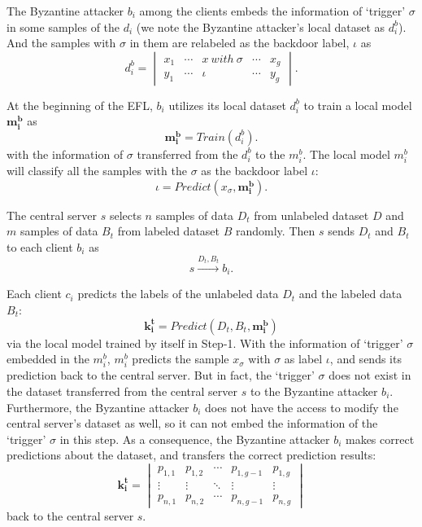 \documentclass[journal]{IEEEtran}
\begin{document}
\par The Byzantine attacker $b_i$ among the clients embeds the information of `trigger' $\sigma$ in some samples of the $d_i$ (we note the Byzantine attacker's local dataset as $d_i^b$). And the samples with $\sigma$ in them are relabeled as the backdoor label, $\iota$ as
\begin{equation}
d_i^b=\begin{vmatrix}
  x_{1} & \cdots  & x \ with \ \sigma  & \cdots & x_{g}\\ 
  y_{1} & \cdots  & \iota & \cdots & y_{g}
\end{vmatrix}.
\end{equation}
\par At the beginning of the EFL, $b_{i}$ utilizes its local dataset $d_i^b$ to train a local model $\mathbf{m_i^b}$ as
\begin{equation}
\mathbf{m_i^b}=Train(d_i^b).
\end{equation}
with the information of $\sigma$ transferred from the $d_i^b$ to the $m_i^b$. The local model $m_i^b$ will classify all the samples with the $\sigma$ as the backdoor label $\iota$:
\begin{equation}
\iota=Predict(x_\sigma, \mathbf{m_i^b}).
\end{equation}

\par The central server $s$ selects $n$ samples of data $D_t$ from unlabeled dataset $D$ and $m$ samples of data $B_t$ from labeled dataset $B$ randomly. Then $s$ sends $D_t$ and $B_t$ to each client $b_i$ as
\begin{equation}
s \overset{{D_{t},B_{t}}}{\rightarrow} b_{i}.
\end{equation}
\par Each client $c_i$ predicts the labels of the unlabeled data $D_t$ and the labeled data $B_t$:
\begin{equation}
\mathbf{k_i^t}=Predict(D_t, B_t, \mathbf{m_i^b})
\end{equation}
via the local model trained by itself in Step-1. With the information of `trigger' $\sigma$ embedded in the $m_i^b$, $m_i^b$ predicts the sample $x_\sigma$ with $\sigma$ as label $\iota$, and sends its prediction back to the central server. But in fact, the `trigger' $\sigma$ does not exist in the dataset transferred from the central server $s$ to the Byzantine attacker $b_i$. Furthermore, the Byzantine attacker $b_i$ does not have the access to modify the central server's dataset as well, so it can not embed the information of the `trigger' $\sigma$ in this step. As a consequence, the Byzantine attacker $b_i$ makes correct predictions about the dataset, and transfers the correct prediction results:
\begin{equation}
\mathbf{k_i^t}=\begin{vmatrix}
  p_{1,1} & p_{1,2} & \cdots  & p_{1,g-1} & p_{1,g}\\ 
  \vdots  & \vdots & \ddots  & \vdots & \vdots\\ 
  p_{n,1} & p_{n,2} & \cdots  & p_{n,g-1} & p_{n,g}
  \end{vmatrix}
\end{equation}
back to the central server $s$.
\end{document}
